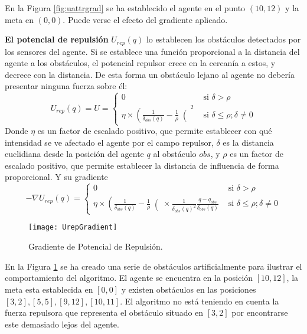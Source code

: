 En la Figura \ref{fig:uattrgrad} se ha establecido el agente en el punto $(10,12)$ y la meta en $(0,0)$. Puede verse el efecto del gradiente aplicado.

\textbf{El potencial de repulsión} $U_{rep}(q)$ lo establecen los obstáculos detectados por los sensores del agente. Si se establece una función proporcional a la distancia del agente a los obstáculos, el potencial repulsor crece en la cercanía a estos, y decrece con la distancia. De esta forma un obstáculo lejano al agente no debería presentar ninguna fuerza sobre él:
\begin{equation}
U_{rep}(q) = U = \begin{cases}
0 & \text{ si } \delta > \rho \\ 
\eta \times \left(\frac{1}{\delta_{obs}(q)}-\frac{1}{\rho}\right(^2 & \text{ si } \delta \leq \rho; \delta \neq 0 
\end{cases}
\label{equation:Urepq}
\end{equation}
Donde $\eta$ es un factor de escalado positivo, que permite establecer con qué intensidad se ve afectado el agente por el campo repulsor, $\delta$ es la distancia euclidiana desde la posición del agente $q$ al obstáculo $obs$, y $\rho$ es un factor de escalado positivo, que permite establecer la distancia de influencia de forma proporcional. Y su gradiente
\begin{equation}
-\nabla U_{rep}(q) = \begin{cases} 0 & \text{ si } \delta > \rho \\
\eta \times \left(\frac{1}{\delta_{obs}(q)}-\frac{1}{\rho}\right( \times \frac{1}{\delta_\mathit{obs}(q)^2}\frac{q-q_\mathit{obs}}{\delta_\mathit{obs}(q)} & \text{ si }  \delta \leq \rho; \delta \neq 0  
\end{cases}
\label{equation:dUrepq}
\end{equation}
\begin{figure}[H]
	\centering
	\texttt{[image: UrepGradient]}
	\caption{Gradiente de Potencial de Repulsión.}\label{fig:urepgrad}
\end{figure}

 En la Figura \ref{fig:urepgrad} se ha creado una serie de obstáculos artificialmente para ilustrar el comportamiento del algoritmo. El agente se encuentra en la posición $[10, 12]$, la meta esta establecida en $[0, 0]$ y existen obstáculos en las posiciones $[3, 2], [5, 5], [9, 12], [10, 11]$. El algoritmo no está teniendo en cuenta la fuerza repulsora que representa el obstáculo situado en $[3, 2]$ por encontrarse este demasiado lejos del agente.

